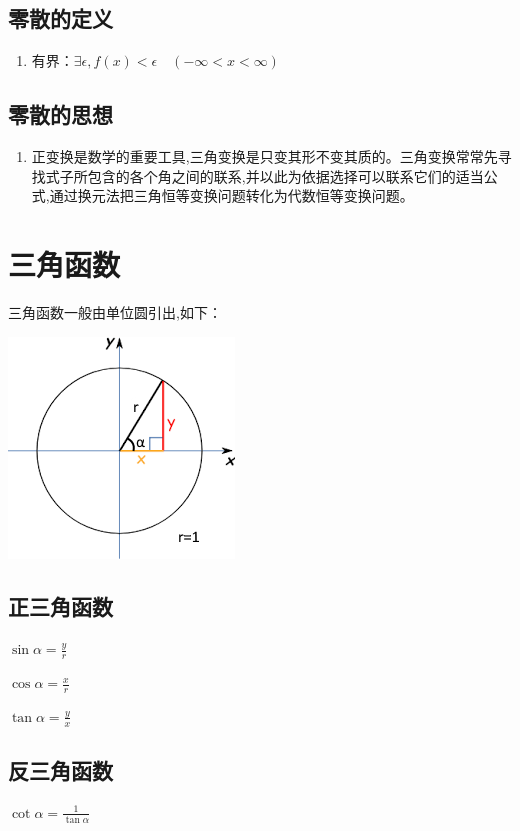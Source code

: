\documentclass[UTF8]{ctexbook}
\begin{document}
{{{}%

\subsection{零散的定义}{
  \begin{enumerate}
    \item 有界：$\exists\epsilon,f(x) < \epsilon\quad(-\infty < x < \infty )$
  \end{enumerate}
}%

\subsection{零散的思想}{
  \begin{enumerate}
    \item 正变换是数学的重要工具,三角变换是只变其形不变其质的。三角变换常常先寻找式子所包含的各个角之间的联系,并以此为依据选择可以联系它们的适当公式,通过换元法把三角恒等变换问题转化为代数恒等变换问题。
  \end{enumerate}
}%

}%

\section{三角函数}{
三角函数一般由单位圆引出,如下：

\includegraphics{resources/UnitCircle.png}

\subsection{正三角函数}{
  $\sin{\alpha} = \frac{y}{r}$

  $\cos{\alpha} = \frac{x}{r}$

  $\tan{\alpha} = \frac{y}{x}$
}%

\subsection{反三角函数}{
  $\cot{\alpha} = \frac{1}{\tan{\alpha}}$

}}}
\end{document}
